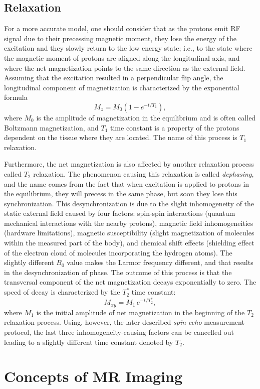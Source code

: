 \subsection{Relaxation}
For a more accurate model, one should consider that as the protons emit RF signal due to their precessing magnetic moment, they lose the energy of the excitation and they slowly return to the low energy state; i.e., to the state where the magnetic moment of protons are aligned along the longitudinal axis, and where the net magnetization points to the same direction as the external field. Assuming that the excitation resulted in a perpendicular flip angle, the longitudinal component of magnetization is characterized by the exponential formula
\[M_z = M_0 (1 - e^{-t/T_1}),\]
where $M_0$ is the amplitude of magnetization in the equilibrium and is often called Boltzmann magnetization, and $T_1$ time constant is a property of the protons dependent on the tissue where they are located. The name of this process is $T_1$ relaxation.

Furthermore, the net magnetization is also affected by another relaxation process called $T_2$ relaxation. The phenomenon causing this relaxation is called \textit{dephasing}, and the name comes from the fact that when excitation is applied to protons in the equilibrium, they will precess in the same phase, but soon they lose this synchronization. This desynchronization is due to the slight inhomogeneity of the static external field caused by four factors: spin-spin interactions (quantum mechanical interactions with the nearby protons), magnetic field inhomogeneities (hardware limitations), magnetic susceptibility (slight magnetization of molecules within the measured part of the body), and chemical shift effects (shielding effect of the electron cloud of molecules incorporating the hydrogen atoms). The slightly different $B_0$ value makes the Larmor frequency different, and that results in the desynchronization of phase. The outcome of this process is that the transversal component of the net magnetization decays exponentially to zero. The speed of decay is characterized by the $T_2^*$ time constant:
\[M_{xy} = M_1\,e^{-t/T_2^*},\]
where $M_1$ is the initial amplitude of net magnetization in the beginning of the $T_2$ relaxation process. Using, however, the later described \textit{spin-echo} measurement protocol, the last three inhomogeneity-causing factors can be cancelled out leading to a slightly different time constant denoted by $T_2$.

\section{Concepts of MR Imaging}

